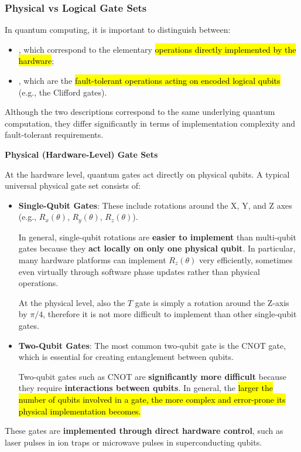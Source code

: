 \subsubsection{Physical vs Logical Gate Sets}

In quantum computing, it is important to distinguish between:
\begin{itemize}
    \item {}, which correspond to the elementary \hl{operations directly implemented by the hardware};
    \item {}, which are the \hl{fault-tolerant operations acting on encoded logical qubits} (e.g., the Clifford gates).
\end{itemize}
Although the two descriptions correspond to the same underlying quantum computation, they differ significantly in terms of implementation complexity and fault-tolerant requirements.

\highspace
\begin{flushleft}
	\textcolor{Green3}{ \textbf{Physical (Hardware-Level) Gate Sets}}
\end{flushleft}
At the hardware level, quantum gates act directly on physical qubits. A typical universal physical gate set consists of:
\begin{itemize}
	\item \textbf{Single-Qubit Gates}: These include rotations around the X, Y, and Z axes (e.g., $R_x(\theta)$, $R_y(\theta)$, $R_z(\theta)$).

	In general, single-qubit rotations are \textbf{easier to implement} than multi-qubit gates because they \textbf{act locally on only one physical qubit}. In particular, many hardware platforms can implement $R_z (\theta)$ very efficiently, sometimes even virtually through software phase updates rather than physical operations.

	At the physical level, also the $T$ gate is simply a rotation around the Z-axis by $\pi/4$, therefore it is not more difficult to implement than other single-qubit gates.


	\item \textbf{Two-Qubit Gates}: The most common two-qubit gate is the CNOT gate, which is essential for creating entanglement between qubits.

	Two-qubit gates such as CNOT are \textbf{significantly more difficult} because they require \textbf{interactions between qubits}. In general, the \hl{larger the number of qubits involved in a gate, the more complex and error-prone its physical implementation becomes.}
\end{itemize}
These gates are \textbf{implemented through direct hardware control}, such as laser pulses in ion traps or microwave pulses in superconducting qubits.

